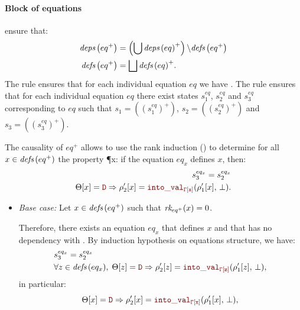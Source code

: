 \begin{skippableproof}
    \paragraph{Block of equations}
     ensure that:
    \begin{align*}
        {\ensuremath{\textit{deps}\left(eq^+\right)}} & = \left(\bigcup {\ensuremath{\textit{deps}\left(eq\right)}}^+\right) \backslash {\ensuremath{\textit{defs}\left(eq^+\right)}} \\
        {\textit{defs}\left(eq^+\right)} & = \bigsqcup {\ensuremath{\textit{defs}\left(eq\right)}}^+.
    \end{align*}
    The rule  ensures that for each
    individual equation $eq$ we have .
    The rule  ensures that for each
    individual equation $eq$ there exist states $s^{eq}_1$, $s^{eq}_2$ and $s^{eq}_3$
    corresponding to $eq$ such that $s_1 = ((s_1^{eq})^+)$, $s_2 = ((s_2^{eq})^+)$ and
    $s_3 = ((s_3^{eq})^+)$.

    The causality of $eq^+$ allows to use the rank induction
    () to determine for all
    $x \in {\ensuremath{\textit{defs}\left(eq^+\right)}}$ the property \P{x}: if the equation $eq_x$ defines $x$, then:
    \begin{align*}
        s_3^{eq_x} = s_2^{eq_x} \\
        \Theta[x] = \dType \Rightarrow \rho'_2[x] = \intoVal{\tyCtx[x]}{\rho'_1[x]}{\bot}.
    \end{align*}

    \begin{itemize}
        \item \textit{Base case:} Let $x \in {\ensuremath{\textit{defs}\left(eq^+\right)}}$ such that ${\textit{rk}_{eq^+}(x)} = 0$.

              Therefore, there exists an equation $eq_x$ that defines $x$ and that has no
              dependency with . By induction hypothesis on equations structure,
              we have:
              \begin{align*}
                   & s_3^{eq_x} = s_2^{eq_x}                                                                                          \\
                   & \forall z \in \defs{eq_x}, \; \Theta[z] = \dType \Rightarrow \rho'_2[z] = \intoVal{\tyCtx[z]}{\rho'_1[z]}{\bot},
              \end{align*}
              in particular:
              \begin{equation*}
                  \Theta[x] = \dType \Rightarrow \rho'_2[x] = \intoVal{\tyCtx[x]}{\rho'_1[x]}{\bot},
              \end{equation*}


\end{itemize}
\end{skippableproof}
